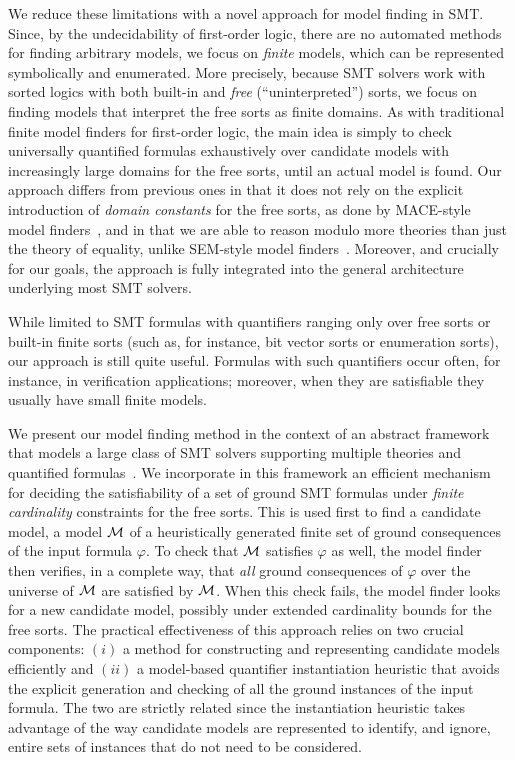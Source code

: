 \documentclass{svjour3}                     %
\begin{document}
We reduce these limitations with a novel approach for model finding in SMT.
Since, by the undecidability of first-order logic,
there are no automated methods for finding arbitrary models,
we focus on \emph{finite} models, 
which can be represented symbolically and enumerated.
More precisely, because SMT solvers work with sorted logics
with both built-in and \emph{free} 
(``uninterpreted'') sorts,
we focus on finding models that interpret the free sorts as finite domains.
As with traditional finite model finders for first-order logic,
the main idea is simply to check universally quantified formulas exhaustively 
over candidate models with increasingly large domains for the free sorts,
until an actual model is found.
Our approach differs from previous ones in that it does not rely on the explicit 
introduction of \emph{domain constants} for the free sorts, 
as done by MACE-style model finders~\cite{Claessen:Soerensson:MACEimprove:ModelComputationWS:2003},
and
in that we are able to reason modulo more theories than just the theory of equality,
unlike SEM-style model finders~\cite{Zhang1995IJCAI}.
Moreover, and crucially for our goals, the approach is fully integrated into the general architecture underlying most SMT solvers.

While limited to SMT formulas with quantifiers
ranging only over free sorts or built-in finite sorts (such as, for instance,
bit vector sorts or enumeration sorts), our approach is still quite useful.
Formulas with such quantifiers occur often,
for instance, in verification applications;
moreover, when they are satisfiable they usually have small finite models.

We present our model finding method in the context 
of an abstract framework that models a large class of SMT solvers 
supporting multiple theories and quantified formulas~\cite{KrsGoe-FROCOS-07}.
We incorporate in this framework
an efficient mechanism for deciding the satisfiability of a set 
of ground SMT formulas under \emph{finite cardinality} constraints for the free sorts.
This is used first to find a candidate model,
a model $\mathcal{M}$ of a heuristically generated finite set of ground consequences 
of the input formula $\varphi$.
To check that $\mathcal{M}$ satisfies $\varphi$ as well, the model finder then 
verifies, in a complete way, that \emph{all} ground consequences of $\varphi$ 
over the universe of $\mathcal{M}$ are satisfied by $\mathcal{M}$.
When this check fails, the model finder looks for a new candidate model,
possibly under extended cardinality bounds for the free sorts.
The practical effectiveness of this approach relies on two crucial components:
$(i)$ a method for constructing and representing candidate models efficiently
and 
$(ii)$ a model-based quantifier instantiation heuristic that avoids the explicit generation and checking of all the ground instances of the input formula.
The two are strictly related since the instantiation heuristic
takes advantage of the way candidate models are represented 
to identify, and ignore, entire sets of instances that do not need 
to be considered.
\end{document}
